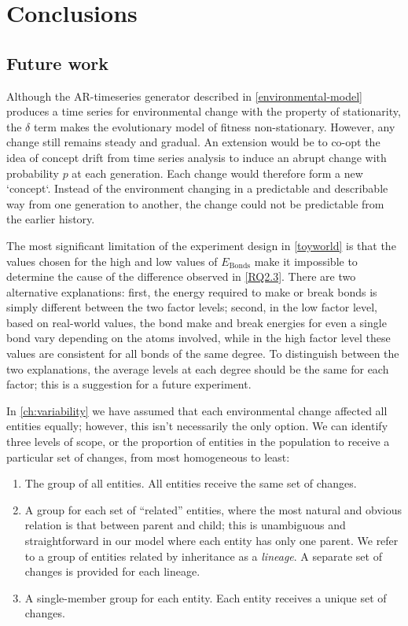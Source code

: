 \chapter{Conclusions}\label{thesis-conclusions}

\section{Future work}

Although the AR-timeseries generator described in \cref{environmental-model} produces a time series for environmental change with the property of stationarity, the $\delta$ term makes the evolutionary model of fitness non-stationary. However, any change still remains steady and gradual. An extension would be to co-opt the idea of concept drift from time series analysis to induce an abrupt change with probability $p$ at each generation. Each change would therefore form a new `concept`. Instead of the environment changing in a predictable and describable way from one generation to another, the change could not be predictable from the earlier history.


The most significant limitation of the experiment design in \cref{toyworld} is that the values chosen for the high and low values of $E_\mathrm{Bonds}$ make it impossible to determine the cause of the difference observed in \cref{RQ2.3}. There are two alternative explanations: first, the energy required to make or break bonds is simply different between the two factor levels; second, in the low factor level, based on real-world values, the bond make and break energies for even a single bond vary depending on the atoms involved, while in the high factor level these values are consistent for all bonds of the same degree. To distinguish between the two explanations, the average levels at each degree should be the same for each factor; this is a suggestion for a future experiment.

In \cref{ch:variability} we have assumed that each environmental change affected all entities equally; however, this isn't necessarily the only option. We can identify three levels of scope, or the proportion of entities in the population to receive a particular set of changes, from most homogeneous to least:

\begin{enumerate}
	\item The group of all entities. All entities receive the same set of changes.
	\item A group for each set of ``related'' entities, where the most natural and obvious relation is that between parent and child; this is unambiguous and straightforward in our model where each entity has only one parent. We refer to a group of entities related by inheritance as a \emph{lineage}. A separate set of changes is provided for each lineage.
	\item A single-member group for each entity. Each entity receives a unique set of changes.
\end{enumerate}

